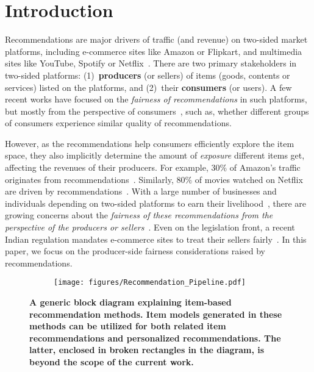 \vspace{-2mm}
\section{Introduction} 
\label{sec:intro}
Recommendations are major drivers of traffic (and revenue) on two-sided market platforms, 
including e-commerce sites like Amazon or
Flipkart, and multimedia sites like YouTube, Spotify or 
Netflix~\cite{gomez2016netflix,smith2017two,AmazonRINSale}. 
There are two primary stakeholders in two-sided platforms: 
(1)~{\bf producers} (or sellers) of items (goods, contents or services) listed on the platforms, 
and (2)~their {\bf consumers} (or users). %
A few recent works have focused on the {\it fairness of recommendations} in such platforms, but mostly from the perspective of consumers~\cite{yao2017beyond,zhu2018fairness,edizel2019fairecsys,geyik2019fairness},  %
such as, whether different groups of consumers experience similar %
quality of recommendations.


However, as the recommendations help consumers efficiently explore the item space, 
they also implicitly determine the amount of {\it exposure} different items get, 
affecting the revenues of their producers. For example, %
$30\%$ of Amazon's traffic originates from 
recommendations~\cite{sharma2015estimating}. Similarly, $80\%$ of movies 
watched on Netflix are driven by recommendations~\cite{gomez2016netflix}. 
With a large number of businesses and individuals depending on two-sided platforms %
to earn their livelihood~\cite{chakraborty2017fair}, there are growing concerns about 
the {\it fairness of these recommendations from the perspective of the producers or sellers}~\cite{patro2020fairrec,edizel2019fairecsys,yao2017beyond}.  
Even on the legislation front, a recent Indian regulation mandates e-commerce sites to treat their sellers fairly~\cite{pib2018ecommerce}. In this paper, we focus on the producer-side fairness considerations raised by recommendations.

\begin{figure}[tb]
	\begin{subfigure}{\columnwidth}
		\centering
		\texttt{[image: figures/Recommendation\_Pipeline.pdf]}
		\label{fig:pipeline}
	\end{subfigure}%
	\vspace*{-5mm}
	\caption{{\bf A generic block diagram explaining item-based recommendation methods. Item models generated in these methods can be utilized for both related item recommendations and personalized recommendations. The latter, enclosed in broken rectangles in the diagram, is beyond the scope of the current work.}}
	\label{fig:recopipeline}
	\vspace*{-6mm}
\end{figure}


